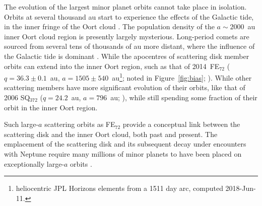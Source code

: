 \documentclass[preprint]{aastex62}
\begin{document}
The evolution of the largest minor planet orbits cannot take place in isolation. 
Orbits at several thousand au start to experience the effects of the Galactic tide, in the inner fringe of the Oort cloud \citep{dones04}.
The population density of the $a \sim 2000$~au inner Oort cloud region is presently largely mysterious. 
Long-period comets are sourced from several tens of thousands of au more distant, where the influence of the Galactic tide is dominant \cite[e.g.][]{dones04}.
While the apocentres of scattering disk member orbits can extend into the inner Oort region, such as that of 2014~FE$_{72}$ ($q = 36.3\pm 0.1$~au, $a=1505\pm 540$~au\footnote{heliocentric JPL Horizons elements from a 1511 day arc, computed 2018-Jun-11.}; noted in Figure~\ref{fig:bias}; \citealt{sheppardtrujillo16}). While other scattering members have more significant evolution of their orbits, like that of 2006 SQ$_{372}$ ($q = 24.2$~au, $a = 796$~au; \citealt{Kaib:2009}), while still spending some fraction of their orbit in the inner Oort region.  

Such large-$a$ scattering orbits as FE$_{72}$ provide a conceptual link between the scattering disk and the inner Oort cloud, both past and present.
The emplacement of the scattering disk and its subsequent decay under encounters with Neptune require many millions of minor planets to have been placed on exceptionally large-$a$ orbits \citep{gladman05, levison06}.
\end{document}
